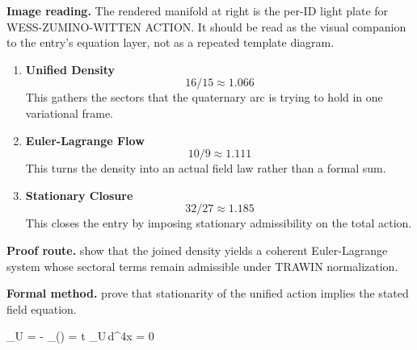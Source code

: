 \begin{samepage}
\noindent\begin{minipage}[t]{0.45\linewidth}
\vspace{0pt}
\raggedright
\scriptsize\textbf{Image reading.} The rendered manifold at right is the per-ID light plate for WESS-ZUMINO-WITTEN ACTION. It should be read as the visual companion to the entry's equation layer, not as a repeated template diagram.\par
\end{minipage}\hfill
\begin{minipage}[t]{0.53\linewidth}
\vspace*{-0.10in}
\raggedright
{}
\end{minipage}
\end{samepage}

\clearpage


\begin{enumerate}[leftmargin=1.6em,itemsep=9pt,topsep=6pt]
\item \textbf{Unified Density}
\[
16/15 \approx 1.066
\]
This gathers the sectors that the quaternary arc is trying to hold in one variational frame.

\item \textbf{Euler-Lagrange Flow}
\[
10/9 \approx 1.111
\]
This turns the density into an actual field law rather than a formal sum.

\item \textbf{Stationary Closure}
\[
32/27 \approx 1.185
\]
This closes the entry by imposing stationary admissibility on the total action.
\end{enumerate}

\textbf{Proof route.} show that the joined density yields a coherent Euler-Lagrange system whose sectoral terms remain admissible under TRAWIN normalization.

\textbf{Formal method.} prove that stationarity of the unified action implies the stated field equation.

\medskip
{}

\begin{tzpsnapshot}
\end{tzpsnapshot}

\tzpequationlinks
  {_{U} = \cdots}
  { - \partial_{\mu}\!\left(\right) = \cdots}
  { \!\in t _{U}\,d^4x = 0}
